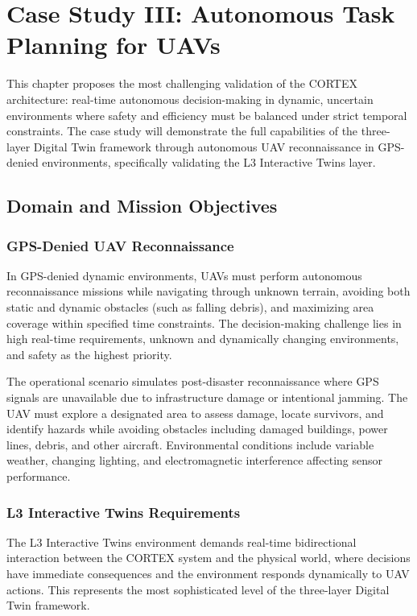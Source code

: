 
\chapter{Case Study III: Autonomous Task Planning for UAVs} \label{chp:uav}

This chapter proposes the most challenging validation of the CORTEX architecture: real-time autonomous decision-making in dynamic, uncertain environments where safety and efficiency must be balanced under strict temporal constraints. The case study will demonstrate the full capabilities of the three-layer Digital Twin framework through autonomous UAV reconnaissance in GPS-denied environments, specifically validating the L3 Interactive Twins layer.

\section{Domain and Mission Objectives}

\subsection{GPS-Denied UAV Reconnaissance}

In GPS-denied dynamic environments, UAVs must perform autonomous reconnaissance missions while navigating through unknown terrain, avoiding both static and dynamic obstacles (such as falling debris), and maximizing area coverage within specified time constraints. The decision-making challenge lies in high real-time requirements, unknown and dynamically changing environments, and safety as the highest priority.

The operational scenario simulates post-disaster reconnaissance where GPS signals are unavailable due to infrastructure damage or intentional jamming. The UAV must explore a designated area to assess damage, locate survivors, and identify hazards while avoiding obstacles including damaged buildings, power lines, debris, and other aircraft. Environmental conditions include variable weather, changing lighting, and electromagnetic interference affecting sensor performance.

\subsection{L3 Interactive Twins Requirements}

The L3 Interactive Twins environment demands real-time bidirectional interaction between the CORTEX system and the physical world, where decisions have immediate consequences and the environment responds dynamically to UAV actions. This represents the most sophisticated level of the three-layer Digital Twin framework.

